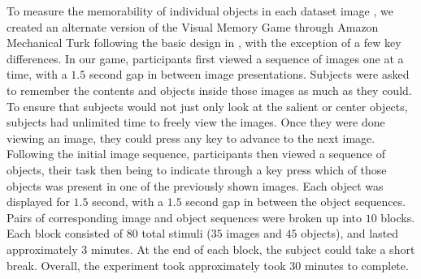 To measure the memorability of individual objects in each dataset image , we created an alternate version of the Visual Memory Game through Amazon Mechanical Turk following the basic design in \cite{isola11}, with the exception of a few key differences. In our game, participants first viewed a sequence of images one at a time, with a $1.5$ second gap in between image presentations. Subjects were asked to remember the contents and objects inside those images as much as they could. To ensure that subjects would not just only look at the salient or center objects, subjects had unlimited time to freely view the images. Once they were done viewing an image, they could press any key to advance to the next image. Following the initial image sequence, participants then viewed a sequence of objects, their task then being to indicate through a key press which of those objects was present in one of the previously shown images. Each object was displayed for $1.5$ second, with a $1.5$ second gap in between the object sequences. Pairs of corresponding image and object sequences were broken up into $10$ blocks. Each block consisted of $80$ total stimuli ($35$ images and $45$ objects), and lasted approximately $3$ minutes. At the end of each block, the subject could take a short break. Overall, the experiment took approximately took $30$ minutes to complete.

